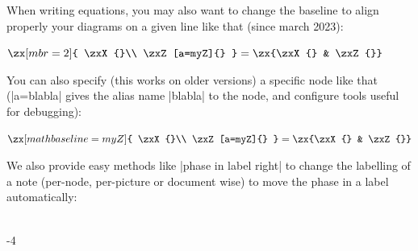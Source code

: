 \documentclass[a4paper,doc2]{ltxdoc} %
\begin{document}
When writing equations, you may also want to change the baseline to align properly your diagrams on a given line like that (since march 2023):
\begin{codeexample}[]
  $\zx[mbr=2]{ %
    \zxX{}\\
    \zxZ[a=myZ]{}
  }
  = \zx{\zxX{} & \zxZ{}}$
\end{codeexample}
You can also specify (this works on older versions) a specific node like that (|a=blabla| gives the alias name |blabla| to the node, and configure tools useful for debugging):
\begin{codeexample}[]
  $\zx[math baseline=myZ]{
    \zxX{}\\
    \zxZ[a=myZ]{}
  }
  = \zx{\zxX{} & \zxZ{}}$
\end{codeexample}

We also provide easy methods like |phase in label right| to change the labelling of a note (per-node, per-picture or document wise) to move the phase in a label automatically:
\begin{codeexample}[]
  \begin{ZX}
    \zxZ{\alpha} \arrow[d] \\
    \zxFracX-{\pi}{4}
  \end{ZX}
\end{codeexample}
\end{document}

